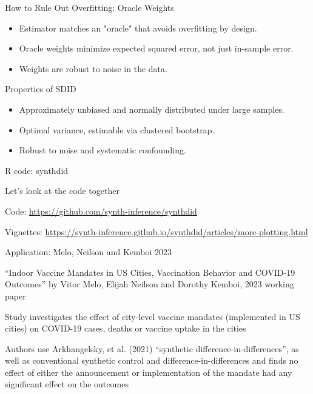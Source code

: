 \documentclass{beamer}
\begin{document}
\begin{frame}{How to Rule Out Overfitting: Oracle Weights}
\begin{itemize}
\item Estimator matches an "oracle" that avoids overfitting by design.
\item Oracle weights minimize expected squared error, not just in-sample error.
\item Weights are robust to noise in the data.
\end{itemize}
\end{frame}


\begin{frame}{Properties of SDID}
\begin{itemize}
\item Approximately unbiased and normally distributed under large samples.
\item Optimal variance, estimable via clustered bootstrap.
\item Robust to noise and systematic confounding.
\end{itemize}
\end{frame}






\begin{frame}{R code: synthdid}

Let's look at the code together

\bigskip

Code: \url{https://github.com/synth-inference/synthdid} 

\bigskip

Vignettes: \url{https://synth-inference.github.io/synthdid/articles/more-plotting.html}

\end{frame}



\begin{frame}{Application: Melo, Neilson and Kemboi 2023}


``Indoor Vaccine Mandates in US Cities, Vaccination Behavior and COVID-19 Outcomes'' by Vitor Melo, Elijah Neilson and Dorothy Kemboi, 2023 working paper

\bigskip

Study investigates the effect of city-level vaccine mandates (implemented in US cities) on COVID-19 cases, deaths or vaccine uptake in the cities

\bigskip

Authors use Arkhangelsky, et al. (2021) ``synthetic difference-in-differences'', as well as conventional synthetic control and difference-in-differences and finds no effect of either the announcement or implementation of the mandate had any significant effect on the outcomes

\end{frame}
\end{document}
